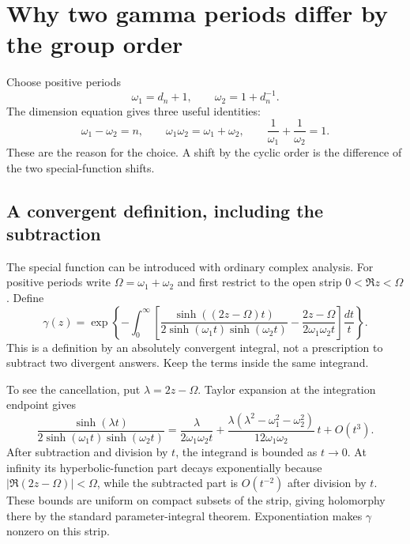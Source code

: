\section{Why two gamma periods differ by the group order}

Choose positive periods
\begin{equation}
 \omega_1=d_n+1,\qquad \omega_2=1+d_n^{-1}.
 \label{eq:HI-gamma-periods}
\end{equation}
The dimension equation gives three useful identities:
\begin{equation}
 \omega_1-\omega_2=n,\qquad
 \omega_1\omega_2=\omega_1+\omega_2,\qquad
 \frac1{\omega_1}+\frac1{\omega_2}=1.
 \label{eq:HI-period-relations}
\end{equation}
These are the reason for the choice.  A shift by the cyclic order
is the difference of the two special-function shifts.

\subsection{A convergent definition, including the subtraction}

The special function can be introduced with ordinary complex analysis.
For positive periods write $\Omega=\omega_1+\omega_2$ and first
restrict to the open strip $0<\Re z<\Omega$. Define
\begin{equation}\label{eq:HI-gamma-integral}
 \gamma(z)=\exp\left\{-\int_0^\infty
 \left[
 \frac{\sinh((2z-\Omega)t)}
      {2\sinh(\omega_1t)\sinh(\omega_2t)}
 -\frac{2z-\Omega}{2\omega_1\omega_2t}
 \right]\frac{dt}{t}\right\}.
\end{equation}
This is a definition by an absolutely convergent integral, not a
prescription to subtract two divergent answers. Keep the terms
inside the same integrand.

To see the cancellation, put $\lambda=2z-\Omega$. Taylor expansion
at the integration endpoint gives
\[
 \frac{\sinh(\lambda t)}
 {2\sinh(\omega_1t)\sinh(\omega_2t)}
 =\frac{\lambda}{2\omega_1\omega_2t}
 +\frac{\lambda(\lambda^2-\omega_1^2-\omega_2^2)}
 {12\omega_1\omega_2}\,t+O(t^3).
\]
After subtraction and division by $t$, the integrand is bounded
as $t\to0$. At infinity its hyperbolic-function part decays
exponentially because
$|\Re(2z-\Omega)|<\Omega$, while the subtracted part is
$O(t^{-2})$ after division by $t$. These bounds are uniform on
compact subsets of the strip, giving holomorphy there by the
standard parameter-integral theorem. Exponentiation makes
$\gamma$ nonzero on this strip.

